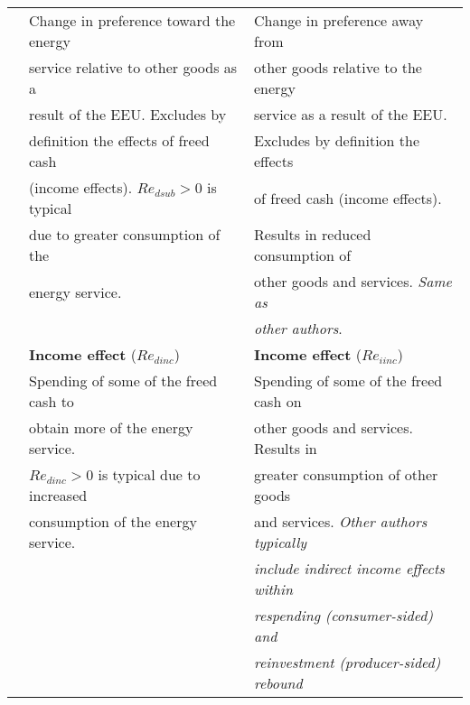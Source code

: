 \begin{table}
\begin{center}
\begin{tabular}{ r l l }
                                   & Change in preference toward the energy       & Change in preference away from  \\
                                   & service relative to other goods as a         & other goods relative to the energy  \\
                                   & result of the EEU. Excludes by               & service as a result of the EEU.  \\
                                   & definition the effects of freed cash         & Excludes by definition the effects \\ 
                                   & (income effects). $Re_{dsub} > 0$ is typical & of freed cash (income effects).     \\ 
                                   & due to greater consumption of the            & Results in reduced consumption of   \\
                                   & energy service.                              & other goods and services. \emph{Same as} \\
                                   &                                              & \emph{other authors}. \\ 
                                   \cmidrule{2-3}
                                   & \textbf{Income effect} ($Re_{dinc}$)         & \textbf{Income effect} ($Re_{iinc}$) \\
                                   & Spending of some of the freed cash to        & Spending of some of the freed cash on  \\
                                   & obtain more of the energy service.           & other goods and services. Results in \\
                                   & $Re_{dinc} > 0$ is typical due to increased  & greater consumption of other goods  \\ 
                                   & consumption of the energy service.           & and services. \emph{Other authors typically} \\
                                   &                                              & \emph{include indirect income effects within} \\
                                   &                                              & \emph{respending (consumer-sided) and} \\
                                   &                                              & \emph{reinvestment (producer-sided) rebound} \\

\end{tabular}
\end{center}
\end{table}
